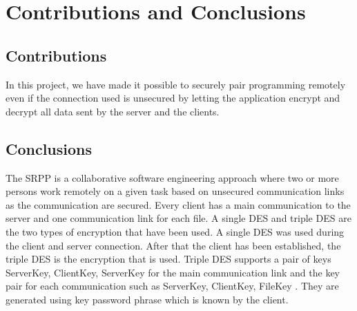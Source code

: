 \section{Contributions and Conclusions}

\subsection{Contributions}

In this project, we have made it possible to securely pair programming remotely even if the connection used is unsecured by letting the application encrypt and decrypt all data sent by the server and the clients.

\subsection{Conclusions}

The SRPP is a collaborative software engineering approach where  two or more persons work remotely on a given task based on unsecured communication links as the communication are secured. Every client has a main communication to the server and one communication link for each file. A single DES and triple DES are the two types of encryption that have been used.  A single DES was used during the client and server connection. After that the client has been  established, the triple DES is the encryption that is used. Triple DES supports a pair of keys { ServerKey, ClientKey, ServerKey } for the main communication link and the key pair for each communication such as { ServerKey, ClientKey, FileKey }. They are generated using key password phrase which is known by the client. 
